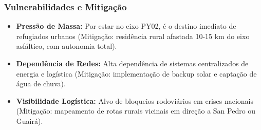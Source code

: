 \subsubsection{Vulnerabilidades e
Mitigação}

\begin{itemize}
\tightlist
\item
  \textbf{Pressão de Massa:} Por estar no eixo PY02, é o destino
  imediato de refugiados urbanos (Mitigação: residência rural afastada
  10-15 km do eixo asfáltico, com autonomia total).
\item
  \textbf{Dependência de Redes:} Alta dependência de sistemas
  centralizados de energia e logística (Mitigação: implementação de
  backup solar e captação de água de chuva).
\item
  \textbf{Visibilidade Logística:} Alvo de bloqueios rodoviários em
  crises nacionais (Mitigação: mapeamento de rotas rurais vicinais em
  direção a San Pedro ou Guairá).
\end{itemize}

